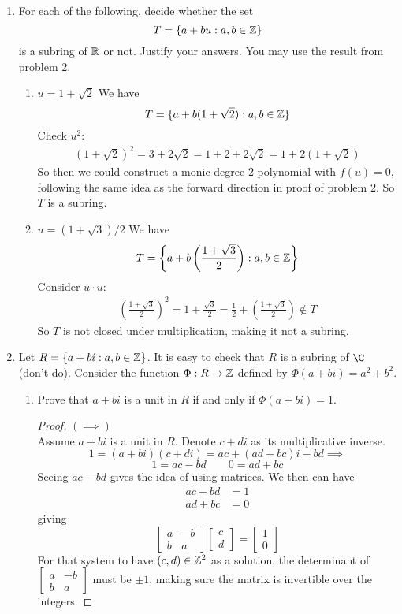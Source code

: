\documentclass[12pt]{article}
\begin{document}
\begin{enumerate}
		\item For each of the following, decide whether the set
		\[ T = \{a+bu : a,b\in \mathbb{Z} \}\]
		is a subring of $\mathbb{R}$ or not. Justify your answers. You may use the result from problem 2.
		\begin{enumerate}
			\item $u = 1 + \sqrt{2}$\m
			We have 
			\[ T = \{a+b(1+\sqrt{2}) : a,b\in \mathbb{Z} \} \]
			Check $u^2$:
			\begin{align*}
				(1 + \sqrt{2})^2 = 3 + 2\sqrt{2} = 1 + 2 + 2\sqrt{2} = 1+2(1+\sqrt{2})
			\end{align*}
			So then we could construct a monic degree 2 polynomial with $f(u)=0$, following the same idea as the forward direction in proof of problem 2. So $T$ is a subring.
			
			\item $u = (1 + \sqrt{3})/2$
			We have 
			\[ T = \left\{a + b\left(\frac{1+\sqrt{3}}{2}\right) : a,b\in \mathbb{Z} \right\} \]
			Consider $u \cdot u$:
			\begin{align*}
				\left( \frac{1+\sqrt{3}}{2} \right)^2 = 1 + \frac{\sqrt{3}}{2} = \frac{1}{2} + \left(\frac{1+\sqrt{3}}{2}\right) \nin T
			\end{align*}
			So $T$ is not closed under multiplication, making it not a subring.
		\end{enumerate}
		
		\item Let $R = \{ a+bi : a,b \in \mathbb{Z}\}$. It is easy to check that $R$ is a subring of $\C$ (don't do). Consider the function $\Phi : R \rightarrow \mathbb{Z}$ defined by $\Phi(a+bi) = a^2 + b^2$.
		\begin{enumerate}
			\item Prove that $a+bi$ is a unit in $R$ if and only if $\Phi(a+bi)=1$.
			\begin{proof}
				$(\implies)$\\
				Assume $a+bi$ is a unit in $R$. Denote $c+di$ as its multiplicative inverse.
				\[1 = (a+bi)(c+di) = ac + (ad+bc)i - bd \implies\]
				\[1 = ac - bd \qquad 0 = ad+bc\]
				Seeing $ac-bd$ gives the idea of using matrices. We then can have
				\begin{align*}
					ac-bd &= 1\\
					ad+bc &= 0
				\end{align*}
				giving
				\[\begin{bmatrix}
					a & -b \\
					b & a
				\end{bmatrix}
				\begin{bmatrix}
					c \\
					d
				\end{bmatrix} = 
				\begin{bmatrix}
					1 \\
					0
				\end{bmatrix}\]
				For that system to have $(c,d) \in \mathbb{Z}^2$ as a solution, the determinant of $\begin{bmatrix}
									a & -b \\
									b & a
								\end{bmatrix}$ must be $\pm1$, making sure
				the matrix is invertible over the integers.
				

\end{proof}
\end{enumerate}
\end{enumerate}
\end{document}
